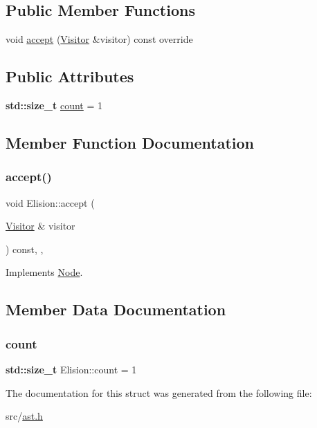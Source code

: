 \subsection*{Public Member Functions}
\begin{DoxyCompactItemize}
\item 
void \hyperlink{struct_elision_ac99f60fccfcedcf9cd090f5682b2e6dd}{accept} (\hyperlink{struct_visitor}{Visitor} \&visitor) const override
\end{DoxyCompactItemize}
\subsection*{Public Attributes}
\begin{DoxyCompactItemize}
\item 
\textbf{ std\+::size\+\_\+t} \hyperlink{struct_elision_a95bc7263a799380ca4e4ddc0cc0eb622}{count} = 1
\end{DoxyCompactItemize}


\subsection{Member Function Documentation}
\mbox{\label{struct_elision_ac99f60fccfcedcf9cd090f5682b2e6dd}} 
\subsubsection{\texorpdfstring{accept()}{accept()}}
{\footnotesize\ttfamily void Elision\+::accept (\begin{DoxyParamCaption}\item[{\hyperlink{struct_visitor}{Visitor} \&}]{visitor }\end{DoxyParamCaption}) const\hspace{0.3cm}{\ttfamily [inline]}, {\ttfamily [override]}, {\ttfamily [virtual]}}



Implements \hyperlink{struct_node_a10bd7af968140bbf5fa461298a969c71}{Node}.



\subsection{Member Data Documentation}
\mbox{\label{struct_elision_a95bc7263a799380ca4e4ddc0cc0eb622}} 
\subsubsection{\texorpdfstring{count}{count}}
{\footnotesize\ttfamily \textbf{ std\+::size\+\_\+t} Elision\+::count = 1}



The documentation for this struct was generated from the following file\+:\begin{DoxyCompactItemize}
\item 
src/\hyperlink{ast_8h}{ast.\+h}\end{DoxyCompactItemize}
